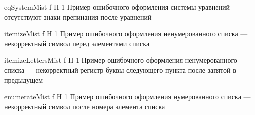\begin{appendices}
	{eqSystemMist} %
	{f} %
	{H} %
	{1\textwidth} %
	{Пример ошибочного оформления системы уравнений --- отсутствуют знаки препинания после уравнений} %
	
	{itemizeMist} %
	{f} %
	{H} %
	{1\textwidth} %
	{Пример ошибочного оформления ненумерованного списка --- некорректный символ перед элементами списка} %
	
	{itemizeLettersMist} %
	{f} %
	{H} %
	{1\textwidth} %
	{Пример ошибочного оформления ненумерованного списка --- некорректный регистр буквы следующего пункта после запятой в предыдущем} %
	
	{enumerateMist} %
	{f} %
	{H} %
	{1\textwidth} %
	{Пример ошибочного оформления нумерованного списка --- некорректный символ после номера элемента списка} %
	
	
\end{appendices}
	
	
